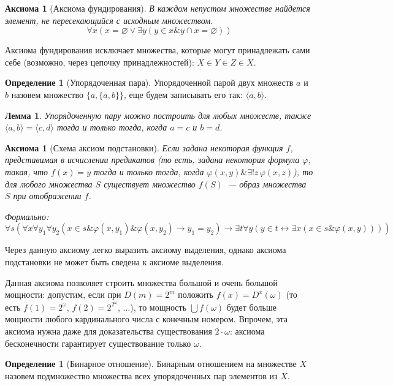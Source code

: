 \documentclass[a4paper,11pt]{article}
\newtheorem{lmm}[thm]{Лемма}
\newtheorem{axm}[thm]{Аксиома}
\theoremstyle{definition}
\newtheorem{dfn}[thm]{Определение}
\newcommand{\amp}{\mathbin{\&}}
\begin{document}
\begin{axm}[Аксиома фундирования]
В каждом непустом множестве найдется элемент, не пересекающийся с исходным
множеством.
\[ \forall x(x = \varnothing \vee \exists y(y \in x \amp y \cap x = \varnothing)) \]
\end{axm}

Аксиома фундирования исключает множества, которые могут принадлежать сами себе
(возможно, через цепочку принадлежностей): $X \in Y \in Z \in X$.

\begin{dfn}[Упорядоченная пара]
Упорядоченной парой двух множеств $a$ и $b$ назовем множество $\{a, \{a,
b\}\}$, еще будем записывать его так: $\langle a, b\rangle$.
\end{dfn}

\begin{lmm}
Упорядоченную пару можно построить для любых множеств, также $\langle a,
b\rangle = \langle c, d\rangle$ тогда и только тогда, когда $a = c$ и $b = d$.
\end{lmm}

\begin{axm}[Схема аксиом подстановки]
Если задана некоторая функция $f$, представимая в исчислении предикатов (то есть,
задана некоторая формула $\varphi$, такая, что $f(x) = y$ тогда и только тогда,
когда $\varphi(x, y) \amp \exists!z\,\varphi(x, z)$), то для любого множества $S$
существует множество $f(S)$~--- образ множества $S$ при отображении $f$.

Формально:
\[ \forall s(\forall x\forall y_1\forall y_2(x \in s \amp \varphi(x, y_1) \amp \varphi(x, y_2) \to y_1 = y_2) \to \exists t\forall y(y \in t \leftrightarrow \exists x(x \in s \amp \varphi(x, y)))) \]
\end{axm}

Через данную аксиому легко выразить аксиому выделения, однако аксиома подстановки
не может быть сведена к аксиоме выделения.

Данная аксиома позволяет строить множества большой и очень большой мощности:
допустим, если при $D(m) = 2^m$ положить $f(x) = D^x(\omega)$ (то есть $f(1) =
2^\omega$, $f(2) = 2^{2^\omega}$, $\dots$), то мощность $\bigcup f(\omega)$
будет больше мощности любого кардинального числа с конечным номером. Впрочем,
эта аксиома нужна даже для доказательства существования $2 \cdot \omega$:
аксиома бесконечности гарантирует существование только $\omega$.

\begin{dfn}[Бинарное отношение]
Бинарным отношением на множестве $X$ назовем подмножество множества всех
упорядоченных пар элементов из $X$.
\end{dfn}
\end{document}
